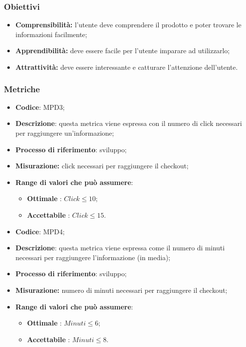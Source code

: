 \subsubsection{Obiettivi}
\begin {itemize}
	\item \textbf{Comprensibilità:} l'utente deve comprendere il prodotto e poter trovare le informazioni facilmente;
	\item \textbf{Apprendibilità:} deve essere facile per l'utente imparare ad utilizzarlo;
	\item \textbf{Attrattività:} deve essere interessante e catturare l'attenzione dell'utente.
\end{itemize}
\subsubsection{Metriche}
\vspace{-1cm}
\begin{itemize}
	\item \textbf{Codice}: MPD3;
	\item \textbf{Descrizione}: questa metrica viene espressa con il numero di click necessari per raggiungere un'informazione;
		\item \textbf{Processo di riferimento}: sviluppo;
	\item \textbf{Misurazione:} click necessari per raggiungere il checkout;
	\item \textbf{Range di valori che può assumere}: 
		\begin{itemize}
			\item \textbf{Ottimale} : $Click \leq10$;
			\item \textbf{Accettabile} : $Click \leq15$.
		\end{itemize}
\end{itemize}
\vspace{-1cm}
\begin{itemize}
	\item \textbf{Codice}: MPD4;
	\item \textbf{Descrizione}: questa metrica viene espressa come il numero di minuti necessari per raggiungere l'informazione (in media);
	\item \textbf{Processo di riferimento}: sviluppo;
	\item \textbf{Misurazione:} numero di minuti necessari per raggiungere il checkout;
	\item \textbf{Range di valori che può assumere}: 
		\begin{itemize}
			\item \textbf{Ottimale} : $Minuti \leq6$;
			\item \textbf{Accettabile} : $Minuti \leq8$.
		\end{itemize}
\end{itemize}

